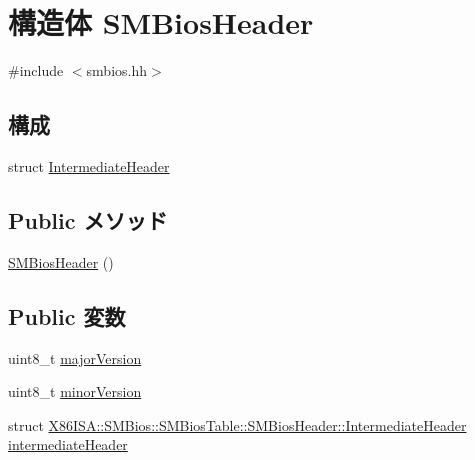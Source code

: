 \hypertarget{structX86ISA_1_1SMBios_1_1SMBiosTable_1_1SMBiosHeader}{
\section{構造体 SMBiosHeader}
\label{structX86ISA_1_1SMBios_1_1SMBiosTable_1_1SMBiosHeader}
}


{\ttfamily \#include $<$smbios.hh$>$}\subsection*{構成}
\begin{DoxyCompactItemize}
\item 
struct \hyperlink{structX86ISA_1_1SMBios_1_1SMBiosTable_1_1SMBiosHeader_1_1IntermediateHeader}{IntermediateHeader}
\end{DoxyCompactItemize}
\subsection*{Public メソッド}
\begin{DoxyCompactItemize}
\item 
\hyperlink{structX86ISA_1_1SMBios_1_1SMBiosTable_1_1SMBiosHeader_a694cbbfa020d34c90023d262e4e736d1}{SMBiosHeader} ()
\end{DoxyCompactItemize}
\subsection*{Public 変数}
\begin{DoxyCompactItemize}
\item 
uint8\_\-t \hyperlink{structX86ISA_1_1SMBios_1_1SMBiosTable_1_1SMBiosHeader_a8842006928b763da7c334d250ee3d2fa}{majorVersion}
\item 
uint8\_\-t \hyperlink{structX86ISA_1_1SMBios_1_1SMBiosTable_1_1SMBiosHeader_a5226152cf60d80852dfdbc094a8e4eb6}{minorVersion}
\item 
struct \hyperlink{structX86ISA_1_1SMBios_1_1SMBiosTable_1_1SMBiosHeader_1_1IntermediateHeader}{X86ISA::SMBios::SMBiosTable::SMBiosHeader::IntermediateHeader} \hyperlink{structX86ISA_1_1SMBios_1_1SMBiosTable_1_1SMBiosHeader_acd80f257832972df7c3574d0751fa3d3}{intermediateHeader}
\end{DoxyCompactItemize}

